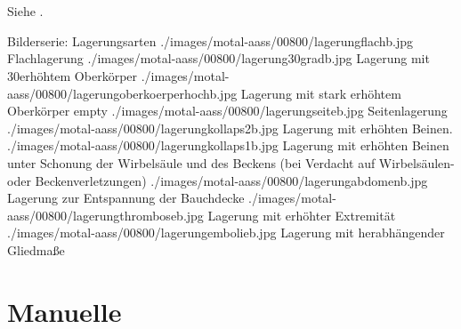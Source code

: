 \clearpage %
\section{}
\subsection{}

\Text
{{\TxBeschreibung}}%
{%
\label{topic:lagerungsarten}%
%
Siehe . 
}%

\begin{PictureSeriesWide}{}{Bilderserie: Lagerungsarten\label{fig:lagerungsarten}}
{./images/motal-aass/00800/lagerungflachb.jpg}
{Flachlagerung}
{./images/motal-aass/00800/lagerung30gradb.jpg}
{Lagerung mit 30\Deg erhöhtem Oberkörper}
{./images/motal-aass/00800/lagerungoberkoerperhochb.jpg}
{Lagerung mit stark erhöhtem Oberkörper }
{empty}
{}
%
{./images/motal-aass/00800/lagerungseiteb.jpg}
{Seitenlagerung}
{./images/motal-aass/00800/lagerungkollaps2b.jpg}
{Lagerung mit erhöhten Beinen.}
{./images/motal-aass/00800/lagerungkollaps1b.jpg}
{Lagerung mit
erhöhten Beinen unter Schonung der Wirbelsäule und des
Beckens (bei Verdacht auf Wirbelsäulen- oder
Beckenverletzungen)}
{}
{}
%
{./images/motal-aass/00800/lagerungabdomenb.jpg}
{Lagerung zur Entspannung der Bauchdecke}
{./images/motal-aass/00800/lagerungthromboseb.jpg}
{Lagerung mit erhöhter Extremität}
{./images/motal-aass/00800/lagerungembolieb.jpg}
{Lagerung mit herabhängender Gliedmaße}
{}
{}
\end{PictureSeriesWide}




\clearpage




\needspace{0.5\textheight}
\section{Manuelle }


